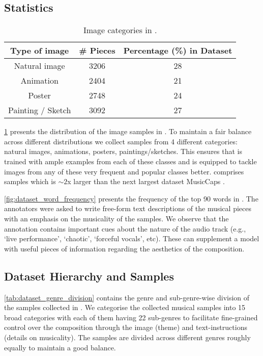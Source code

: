\subsection {\ourdataset Statistics}
\begin{table}[H]
\centering
\resizebox{\columnwidth}{!}
{\begin{tabular}{c | c | c}
\toprule
\textbf{Type of image} & \textbf{\# Pieces} & \textbf{Percentage (\%) in Dataset}\\
\midrule
Natural image & 3206 & 28 \\
Animation & 2404 & 21 \\
Poster & 2748 & 24 \\
Painting / Sketch & 3092 & 27 \\
\bottomrule
\end{tabular}}
\caption{Image categories in \ourdataset.}
\label{tab:dataset}
\end{table}
\cref{tab:dataset} presents the distribution of the image samples in \ourdataset. To maintain a fair balance across different distributions we collect samples from 4 different categories: natural images, animations, posters, paintings/sketches. This ensures that \modelname is trained with ample examples from each of these classes and is equipped to tackle images from any of these very frequent and popular classes better. \ourdataset comprises \ourdatasetsize samples which is $\sim2$x larger than the next largest dataset MusicCaps \cite{musiclm}.

\cref{fig:dataset_word_frequency} presents the frequency of the top 90 words in \ourdataset. The annotators were asked to write free-form text descriptions of the musical pieces with an emphasis on the musicality of the samples. We observe that the annotation contains important cues about the nature of the audio track (e.g., `live performance', `chaotic', `forceful vocals', etc). These can supplement a model with useful pieces of information regarding the aesthetics of the composition.  

\subsection {Dataset Hierarchy and Samples}
\cref{tab:dataset_genre_division} contains the genre and sub-genre-wise division of the samples collected in \ourdataset. We categorise the collected musical samples into 15 broad categories with each of them having 22 sub-genres to facilitate fine-grained control over the composition through the image (theme) and text-instructions (details on musicality). The samples are divided across different genres roughly equally to maintain a good balance.

